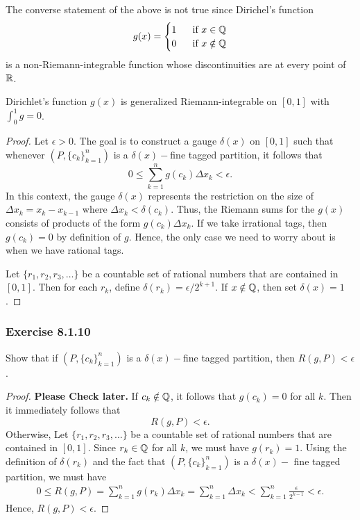 The converse statement of the above is not true since Dirichel's function 
\[  g(x) = 
\begin{cases}
    1 \ &\text{ if } x \in \mathbb{Q} \\
    0 \ &\text{ if } x \notin \mathbb{Q} 
\end{cases} \]
is a non-Riemann-integrable function whose discontinuities are at every point of \( \mathbb{R}  \).

\begin{theorem}{}{}
    Dirichlet's function \( g(x)  \) is generalized Riemann-integrable on \( [0,1]  \) with \( \int_{ 0 }^{ 1 } g = 0  \).
\end{theorem}

\begin{proof}
    Let \( \epsilon > 0  \). The goal is to construct a gauge \( \delta(x)  \) on \( [0,1]  \) such that whenever \( (P, \{ c_{k }  \}_{k=1}^{n}  ) \) is a \( \delta(x)- \)fine tagged partition, it follows that 
    \[  0 \leq \sum_{ k=1 }^{ n } g(c_{k }) \Delta x_{k} < \epsilon. \]
    In this context, the gauge \( \delta(x)  \) represents the restriction on the size of \( \Delta x_{k } = x_{k } - x_{k-1} \) where \( \Delta x_{k } < \delta(c_{k }) \). Thus, the Riemann sums for the \( g(x) \) consists of products of the form \( g(c_{k }) \Delta x_{k } \). If we take irrational tags, then \( g(c_{k}) = 0  \) by definition of \( g  \). Hence, the only case we need to worry about is when we have rational tags.

    Let \( \{ r_{1}, r_{2},  r_{3}, \dots \}  \) be a countable set of rational numbers that are contained in \( [0,1]  \). Then for each \( r_{k }  \), define \( \delta(r_{k }) = \epsilon / 2^{k+1} \). If \( x \notin \mathbb{Q}  \), then set \( \delta(x) = 1  \).
\end{proof}

\subsubsection{Exercise 8.1.10} Show that if \( (P, \{ c_{k } \}_{k=1}^n ) \) is a \( \delta(x)- \)fine tagged partition, then \( R(g,P) < \epsilon \).
\begin{proof}
    \textbf{Please Check later.} If \( c_{k } \notin \mathbb{Q}  \), it follows that \( g(c_{k}) = 0  \) for all \( k  \). Then it immediately follows that 
    \[  R(g,P) < \epsilon. \] 
    Otherwise, Let \( \{ r_{1}, r_{2}, r_{3}, \dots  \}  \) be a countable set of rational numbers that are contained in \( [0,1]  \). Since \( r_{k } \in \mathbb{Q} \) for all \( k  \), we must have \( g(r_{k }) = 1  \). Using the definition of \( \delta(r_{k })  \) and the fact that \( (P, \{ c_{k } \}_{k=1}^n)  \) is a \( \delta(x)-\) fine tagged partition, we must have 
    \begin{align*}
       0 \leq R(g, P)  = \sum_{ k=1 }^{n } g(r_{k }) \Delta x_{k }
                = \sum_{ k=1 }^{ n } \Delta x_{k } 
                < \sum_{ k=1 }^{ n } \frac{ \epsilon  }{ 2^{k-1} }  
                < \epsilon.
    \end{align*}
    Hence, \( R(g,P) < \epsilon. \)
\end{proof}


